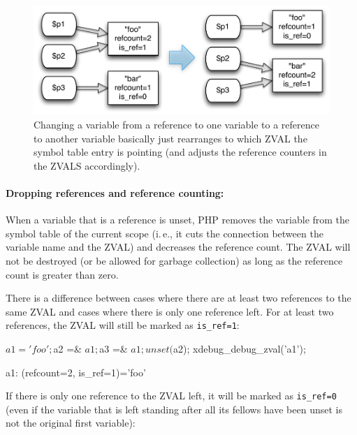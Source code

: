 \begin{figure}[!h]
  \begin{center}
    \includegraphics[scale=0.8]{images/p1_p2_p3}
    \caption{Changing a variable from a reference to one variable to a reference to another variable basically just rearranges to which ZVAL the symbol table entry is pointing (and adjusts the reference counters in the ZVALS accordingly).}
    \label{fig:changing-references}
  \end{center}
\end{figure}




\paragraph{Dropping references and reference counting:}

When a variable that is a reference is unset, PHP removes the variable from the symbol table of the current scope (i.\,e., it cuts the connection between the variable name and the ZVAL) and decreases the reference count. The ZVAL will not be destroyed (or be allowed for garbage collection) as long as the reference count is greater than zero.

There is a difference between cases where there are at least two references to the same ZVAL and cases where there is only one reference left. For at least two references, the ZVAL will still be marked as \texttt{is\_ref=1}:

\begin{phpcode}
$a1 = 'foo';
$a2 =& $a1;
$a3 =& $a1;
unset($a2);
xdebug_debug_zval('a1');
\end{phpcode}

\begin{textcode}
a1: (refcount=2, is_ref=1)='foo'
\end{textcode}

If there is only one reference to the ZVAL left, it will be marked as \texttt{is\_ref=0} (even if the variable that is left standing after all its fellows have been unset is not the original first variable):


